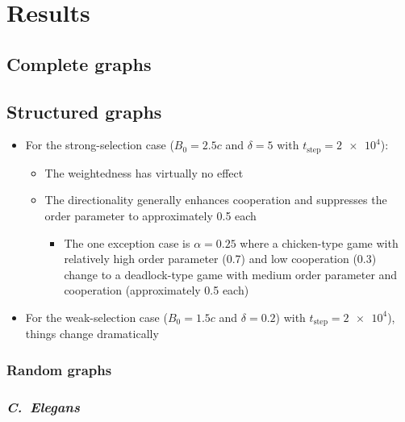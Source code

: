\documentclass[pdflatex,lineno,referee,sn-mathphys-ay]{class/sn-jnl}
\begin{document}
\section{Results}
\subsection{Complete graphs}
\subsection{Structured graphs}
\begin{itemize}
  \item For the strong-selection case ($B_0 = 2.5c$ and $\delta = 5$
    with $t_{\text{step}} = \num{2e4}$):
  \begin{itemize}
    \item The weightedness has virtually no effect
    \item The directionality generally enhances cooperation
      and suppresses the order parameter to approximately
      \num{0.5} each
    \begin{itemize}
      \item The one exception case is $\alpha = \num{0.25}$ where a
        chicken-type game with relatively high order parameter
        (\num{0.7}) and low cooperation (\num{0.3}) change to a
        deadlock-type game with medium order parameter and cooperation
        (approximately \num{0.5} each)
    \end{itemize}
  \end{itemize}
\item For the weak-selection case ($B_0 = 1.5c$ and $\delta = 0.2$) with
  $t_{\text{step}} = \num{2e4}$), things change dramatically
\end{itemize}
\subsubsection{Random graphs}
\subsubsection{\emph{C.\ Elegans}}
\end{document}
